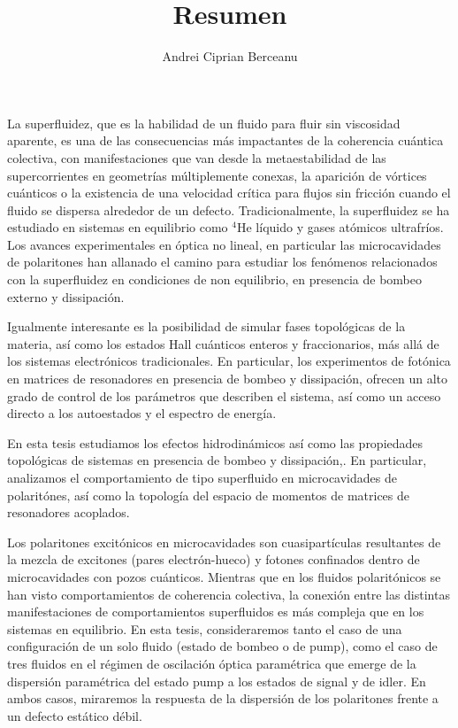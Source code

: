 \documentclass{article}
\title{Resumen}
\author{Andrei Ciprian Berceanu}
\begin{document}
\maketitle

La superfluidez, que es la habilidad de un fluido para fluir sin
viscosidad aparente, es una de las consecuencias m\'as impactantes de
la coherencia cu\'antica colectiva, con manifestaciones que van desde
la metaestabilidad de las supercorrientes en geometr\'ias
m\'ultiplemente conexas, la aparici\'on de v\'ortices cu\'anticos o la
existencia de una velocidad cr\'itica para flujos sin fricci\'on
cuando el fluido se dispersa alrededor de un
defecto. Tradicionalmente, la superfluidez se ha estudiado en sistemas
en equilibrio como $^4$He l\'iquido y gases at\'omicos
ultrafr\'ios. Los avances experimentales en \'optica no lineal, en
particular las microcavidades de polaritones han allanado el camino
para estudiar los fen\'omenos relacionados con la superfluidez en
condiciones de non equilibrio, en presencia de bombeo externo y
dissipaci\'on.

Igualmente interesante es la posibilidad de simular fases
topol\'ogicas de la materia, as\'i como los estados Hall cu\'anticos
enteros y fraccionarios, m\'as all\'a de los sistemas electr\'onicos
tradicionales. En particular, los experimentos de fot\'onica en
matrices de resonadores en presencia de bombeo y dissipaci\'on,
ofrecen un alto grado de control de los par\'ametros que describen el
sistema, as\'i como un acceso directo a los autoestados y el espectro
de energ\'ia.

En esta tesis estudiamos los efectos hidrodin\'amicos as\'i como las
propiedades topol\'ogicas de sistemas en presencia de bombeo y
dissipaci\'on,. En particular, analizamos el comportamiento de tipo
superfluido en microcavidades de polarit\'ones, as\'i como la
topolog\'ia del espacio de momentos de matrices de resonadores
acoplados.

Los polaritones excit\'onicos en microcavidades son cuasipart\'iculas
resultantes de la mezcla de excitones (pares electr\'on-hueco) y
fotones confinados dentro de microcavidades con pozos
cu\'anticos. Mientras que en los fluidos polarit\'onicos se han visto
comportamientos de coherencia colectiva, la conexi\'on entre las
distintas manifestaciones de comportamientos superfluidos es m\'as
compleja que en los sistemas en equilibrio. En esta tesis,
consideraremos tanto el caso de una configuraci\'on de un solo fluido
(estado de bombeo o de pump), como el caso de tres fluidos en el
r\'egimen de oscilaci\'on \'optica param\'etrica que emerge de la
dispersi\'on param\'etrica del estado pump a los estados de signal y
de idler. En ambos casos, miraremos la respuesta de la dispersi\'on de
los polaritones frente a un defecto est\'atico d\'ebil.
\end{document}
